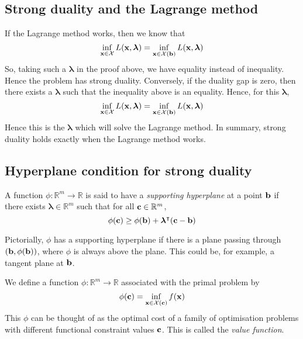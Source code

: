 \subsection{Strong duality and the Lagrange method}
If the Lagrange method works, then we know that
\[
	\inf_{\vb x \in \mathcal X} L(\vb x, \bm \lambda) = \inf_{\vb x \in \mathcal X(\vb b)} L(\vb x, \bm \lambda)
\]
So, taking such a \( \bm \lambda \) in the proof above, we have equality instead of inequality.
Hence the problem has strong duality.
Conversely, if the duality gap is zero, then there exists a \( \bm \lambda \) such that the inequality above is an equality.
Hence, for this \( \bm \lambda \),
\[
	\inf_{\vb x \in \mathcal X} L(\vb x, \bm \lambda) = \inf_{\vb x \in \mathcal X(\vb b)} L(\vb x, \bm \lambda)
\]
Hence this is the \( \bm \lambda \) which will solve the Lagrange method.
In summary, strong duality holds exactly when the Lagrange method works.

\subsection{Hyperplane condition for strong duality}
\begin{definition}
	A function \( \phi \colon \mathbb R^m \to \mathbb R \) is said to have a \textit{supporting hyperplane} at a point \( \vb b \) if there exists \( \bm \lambda \in \mathbb R^m \) such that for all \( \vb c \in \mathbb R^m \),
	\[
		\phi(\vb c) \geq \phi(\vb b) + \bm\lambda^\intercal (\vb c - \vb b)
	\]
\end{definition}
\noindent Pictorially, \( \phi \) has a supporting hyperplane if there is a plane passing through \( (\vb b, \phi(\vb b)) \), where \( \phi \) is always above the plane.
This could be, for example, a tangent plane at \( \vb b \).

\begin{definition}
	We define a function \( \phi \colon \mathbb R^m \to \mathbb R \) associated with the primal problem by
	\[
		\phi(\vb c) = \inf_{\vb x \in \mathcal X(\vb c)} f(\vb x)
	\]
	This \( \phi \) can be thought of as the optimal cost of a family of optimisation problems with different functional constraint values \( \vb c \).
	This is called the \textit{value function}.
\end{definition}


